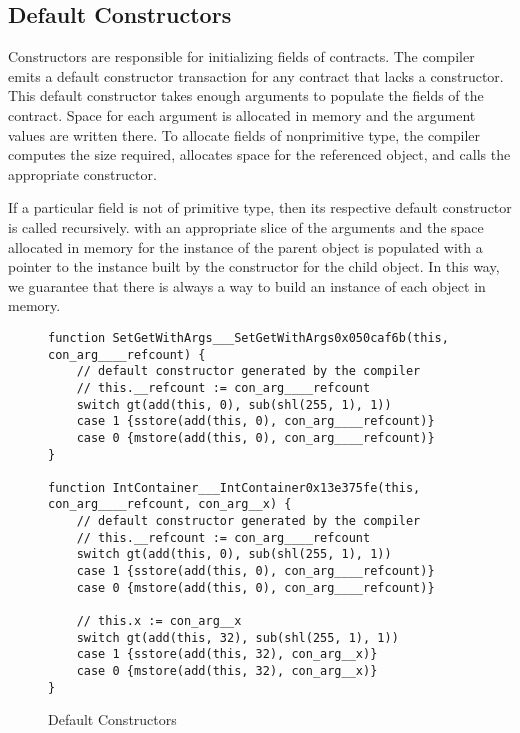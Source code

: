\subsection{Default Constructors}

Constructors are responsible for initializing fields of contracts. The compiler emits a default constructor transaction for any contract that
lacks a constructor. This default constructor takes
enough arguments to populate the fields of the contract. Space
for each argument is allocated in memory and the argument values are
written there. To allocate fields of nonprimitive type, the compiler computes the size required, allocates space for the referenced object, and calls the appropriate constructor. 

If a particular field is not of primitive type, then its
respective default constructor is called recursively. with an appropriate
slice of the arguments and the space allocated in memory for the instance
of the parent object is populated with a pointer to the instance built by
the constructor for the child object. In this way, we guarantee that there
is always a way to build an instance of each object in memory.

\begin{figure}[hbtp]
    \caption{Default Constructors}
    \label{code.3}
    \begin{lstlisting}[language=yul,frame=single]
function SetGetWithArgs___SetGetWithArgs0x050caf6b(this, con_arg____refcount) {
    // default constructor generated by the compiler
    // this.__refcount := con_arg____refcount
    switch gt(add(this, 0), sub(shl(255, 1), 1))
    case 1 {sstore(add(this, 0), con_arg____refcount)}
    case 0 {mstore(add(this, 0), con_arg____refcount)}
}

function IntContainer___IntContainer0x13e375fe(this, con_arg____refcount, con_arg__x) {
    // default constructor generated by the compiler
    // this.__refcount := con_arg____refcount
    switch gt(add(this, 0), sub(shl(255, 1), 1))
    case 1 {sstore(add(this, 0), con_arg____refcount)}
    case 0 {mstore(add(this, 0), con_arg____refcount)}

    // this.x := con_arg__x
    switch gt(add(this, 32), sub(shl(255, 1), 1))
    case 1 {sstore(add(this, 32), con_arg__x)}
    case 0 {mstore(add(this, 32), con_arg__x)}
}
\end{lstlisting}
\end{figure}

